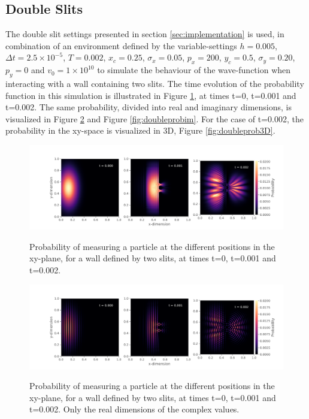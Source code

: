 \documentclass[10pt, nofootinbib, twocolumn]{revtex4-1}
\begin{document}
\subsection{Double Slits}
The double slit settings presented in section \ref{sec:implementation} is used, in combination of an environment defined by the variable-settings $h = 0.005$, $\Delta t = 2.5\times10^{-5}$, $T = 0.002$, $x_c = 0.25$, $\sigma_x = 0.05$, $p_x = 200$, $y_c = 0.5$, $\sigma_y = 0.20$, $p_y = 0$ and $v_0 = 1\times10^{10}$ to simulate the behaviour of the wave-function when interacting with a wall containing two slits. The time evolution of the probability function in this simulation is illustrated in Figure \ref{fig:doubleprob}, at times t=0, t=0.001 and t=0.002. The same probability, divided into real and imaginary dimensions, is visualized in Figure \ref{fig:doubleprobre} and Figure \ref{fig:doubleprobim}. For the case of t=0.002, the probability in the xy-space is visualized in 3D, Figure \ref{fig:doubleprob3D}. 

\begin{figure}
    \caption{Probability of measuring a particle at the different positions in the xy-plane, for a wall defined by two slits, at times t=0, t=0.001 and t=0.002.}
    \centering
    \includegraphics[width = 1\textwidth]{figures/plots_both.pdf} 
    \label{fig:doubleprob}
\end{figure} 

\begin{figure}
    \caption{Probability of measuring a particle at the different positions in the xy-plane, for a wall defined by two slits, at times t=0, t=0.001 and t=0.002. Only the real dimensions of the complex values.}
    \centering
    \includegraphics[width = 1\textwidth]{figures/plots_real.pdf} 
    \label{fig:doubleprobre}
\end{figure} 
\end{document}

